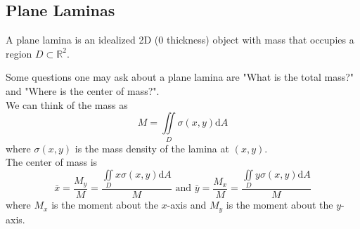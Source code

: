 \subsection{Plane Laminas}
\begin{definition}
	A plane lamina is an idealized 2D (0 thickness) object with mass that occupies a region $D \subset \mathbb{R}^2$.
\end{definition}

\noindent
Some questions one may ask about a plane lamina are "What is the total mass?" and "Where is the center of mass?".\\
We can think of the mass as 
\begin{equation*}
	M = \iint\limits_{D}{\sigma(x,y)\mathrm{d}A}
\end{equation*}
where $\sigma(x,y)$ is the mass density of the lamina at $(x,y)$.\\
The center of mass is
\begin{equation*}
	\bar{x} = \frac{M_y}{M} = \frac{\iint\limits_{D}{x\sigma(x,y)\mathrm{d}A}}{M} \text{ and } \bar{y} = \frac{M_x}{M} = \frac{\iint\limits_{D}{y\sigma(x,y)\mathrm{d}A}}{M}
\end{equation*}
where $M_x$ is the moment about the $x$-axis and $M_y$ is the moment about the $y$-axis.